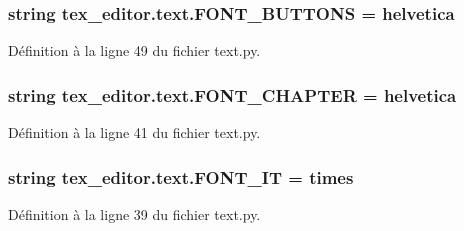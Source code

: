 \subsubsection[{F\+O\+N\+T\+\_\+\+B\+U\+T\+T\+O\+N\+S}]{\setlength{\rightskip}{0pt plus 5cm}string tex\+\_\+editor.\+text.\+F\+O\+N\+T\+\_\+\+B\+U\+T\+T\+O\+N\+S = \textquotesingle{}helvetica\textquotesingle{}}\label{namespacetex__editor_1_1text_a092a6d860a959ef17dfa70c0c374bd44}


Définition à la ligne 49 du fichier text.\+py.

\hypertarget{namespacetex__editor_1_1text_a239169e2c6ed1d9f9cb2e4ff1ec17977}{}
\subsubsection[{F\+O\+N\+T\+\_\+\+C\+H\+A\+P\+T\+E\+R}]{\setlength{\rightskip}{0pt plus 5cm}string tex\+\_\+editor.\+text.\+F\+O\+N\+T\+\_\+\+C\+H\+A\+P\+T\+E\+R = \textquotesingle{}helvetica\textquotesingle{}}\label{namespacetex__editor_1_1text_a239169e2c6ed1d9f9cb2e4ff1ec17977}


Définition à la ligne 41 du fichier text.\+py.

\hypertarget{namespacetex__editor_1_1text_ad2ecd423c254410d6da8371b50098d2e}{}
\subsubsection[{F\+O\+N\+T\+\_\+\+I\+T}]{\setlength{\rightskip}{0pt plus 5cm}string tex\+\_\+editor.\+text.\+F\+O\+N\+T\+\_\+\+I\+T = \textquotesingle{}times\textquotesingle{}}\label{namespacetex__editor_1_1text_ad2ecd423c254410d6da8371b50098d2e}


Définition à la ligne 39 du fichier text.\+py.

\hypertarget{namespacetex__editor_1_1text_ae4abaacad25df0490b14871b84306412}{}
